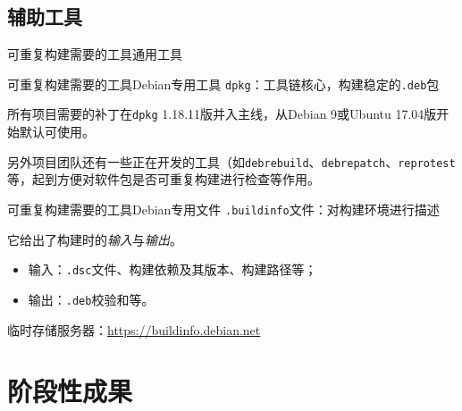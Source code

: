 \documentclass{beamer}
\begin{document}
\subsection{辅助工具}
\begin{frame}[t]{可重复构建需要的工具}{通用工具}
%
\end{frame}
\begin{frame}[t]{可重复构建需要的工具}{Debian专用工具}
{\Large \texttt{dpkg}：工具链核心，构建稳定的\texttt{.deb}包}

\vspace{1em}
所有项目需要的补丁在\texttt{dpkg} 1.18.11版并入主线，从Debian 9或Ubuntu 17.04版开始默认可使用。

\vfill
另外项目团队还有一些正在开发的工具（如\texttt{debrebuild}、\texttt{debrepatch}、\texttt{reprotest}等，起到方便对软件包是否可重复构建进行检查等作用。
\end{frame}
\begin{frame}[t]{可重复构建需要的工具}{Debian专用文件}
{\Large \texttt{.buildinfo}文件：对构建环境进行描述}

\vspace{1em}
它给出了构建时的\emph{输入}与\emph{输出}。
\vspace{1em}
\begin{itemize}
\item 输入：\texttt{.dsc}文件、构建依赖及其版本、构建路径等； 
\item 输出：\texttt{.deb}校验和等。
\end{itemize}
\vspace{1em}
临时存储服务器：\url{https://buildinfo.debian.net}
\end{frame}
\section{阶段性成果}
\end{document}
